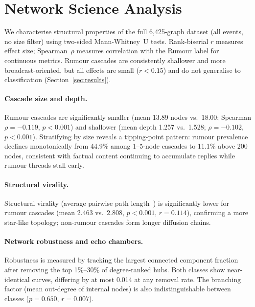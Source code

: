 \documentclass[runningheads]{llncs}
\begin{document}
\section{Network Science Analysis}
\label{sec:topology}

We characterise structural properties of the full 6{,}425-graph dataset (all
events, no size filter) using two-sided Mann-Whitney~U tests. Rank-biserial $r$
measures effect size; Spearman~$\rho$ measures correlation with the Rumour
label for continuous metrics. Rumour cascades are consistently shallower and
more broadcast-oriented, but all effects are small ($r < 0.15$) and do not
generalise to classification (Section~\ref{sec:results}).

\paragraph{Cascade size and depth.}
Rumour cascades are significantly smaller (mean 13.89 nodes vs.\ 18.00;
Spearman $\rho = -0.119$, $p < 0.001$) and shallower (mean depth 1.257
vs.\ 1.528; $\rho = -0.102$, $p < 0.001$). Stratifying by size reveals
a tipping-point pattern: rumour prevalence declines monotonically from
44.9\% among 1--5-node cascades to 11.1\% above 200 nodes, consistent with
factual content continuing to accumulate replies while rumour threads stall early.

\paragraph{Structural virality.}
Structural virality (average pairwise path length~\cite{goel2016structural})
is significantly lower for rumour cascades (mean 2.463 vs.\ 2.808, $p < 0.001$,
$r = 0.114$), confirming a more star-like topology; non-rumour cascades form
longer diffusion chains.

\paragraph{Network robustness and echo chambers.}
Robustness is measured by tracking the largest connected component fraction after
removing the top 1\%--30\% of degree-ranked hubs. Both classes show near-identical curves, differing by at most 0.014 at any removal rate. The branching factor (mean out-degree of internal nodes) is also
indistinguishable between classes ($p = 0.650$, $r = 0.007$).
\end{document}

